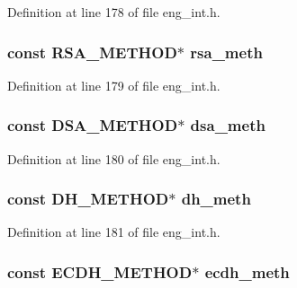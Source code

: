 Definition at line 178 of file eng\+\_\+int.\+h.

\subsubsection[{\texorpdfstring{rsa\+\_\+meth}{rsa_meth}}]{\setlength{\rightskip}{0pt plus 5cm}const {\bf R\+S\+A\+\_\+\+M\+E\+T\+H\+OD}$\ast$ rsa\+\_\+meth}\hypertarget{structengine__st_ad79013e496ce0513b7c277a496b12c0d}{}\label{structengine__st_ad79013e496ce0513b7c277a496b12c0d}


Definition at line 179 of file eng\+\_\+int.\+h.

\subsubsection[{\texorpdfstring{dsa\+\_\+meth}{dsa_meth}}]{\setlength{\rightskip}{0pt plus 5cm}const {\bf D\+S\+A\+\_\+\+M\+E\+T\+H\+OD}$\ast$ dsa\+\_\+meth}\hypertarget{structengine__st_a1e95f5d80c41321a15b490356bfb6465}{}\label{structengine__st_a1e95f5d80c41321a15b490356bfb6465}


Definition at line 180 of file eng\+\_\+int.\+h.

\subsubsection[{\texorpdfstring{dh\+\_\+meth}{dh_meth}}]{\setlength{\rightskip}{0pt plus 5cm}const {\bf D\+H\+\_\+\+M\+E\+T\+H\+OD}$\ast$ dh\+\_\+meth}\hypertarget{structengine__st_a677fbdfebd269974da9fe3cab0f56650}{}\label{structengine__st_a677fbdfebd269974da9fe3cab0f56650}


Definition at line 181 of file eng\+\_\+int.\+h.

\subsubsection[{\texorpdfstring{ecdh\+\_\+meth}{ecdh_meth}}]{\setlength{\rightskip}{0pt plus 5cm}const {\bf E\+C\+D\+H\+\_\+\+M\+E\+T\+H\+OD}$\ast$ ecdh\+\_\+meth}\hypertarget{structengine__st_a8add01e68ccbf35d25450337ab8ab068}{}\label{structengine__st_a8add01e68ccbf35d25450337ab8ab068}


